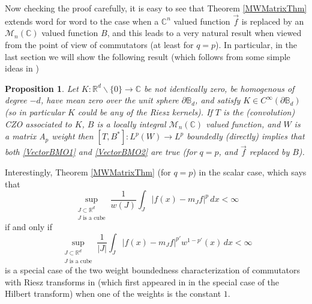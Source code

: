 \documentclass[12pt,reqno ]{amsart}
\numberwithin{equation}{section}
\newtheorem{proposition}[theorem]{Proposition}
\theoremstyle{definition}
\newcommand{\C}{\ensuremath{\mathbb{C}^n}}
\newcommand{\R}{\ensuremath{\mathbb{R}}}
\newcommand{\Mn}{\ensuremath{\mathcal{M}_{n }}(\mathbb{C})}
\begin{document}
 Now checking the proof carefully, it is easy to see that Theorem \ref{MWMatrixThm}  extends word for word to the case when a $\C$ valued function $\vec{f}$ is replaced by an $\Mn$ valued function $B$, and this leads to a very natural result when viewed from the point of view of commutators (at least for $q = p$).  In particular, in the last section we will show the following result (which follows from some simple ideas in \cite{IKP})  \begin{proposition}  \label{CommProp} Let $K : \mathbb{R}^d \backslash \{0\} \rightarrow \mathbb{C}$  be not identically zero, be homogenous of degree $-d$, have mean zero over the unit sphere $\partial \mathbb{B}_d$, and satisfy $K \in C^{\infty} (\partial \mathbb{B}_d)$ (so in particular $K$ could be any of the Riesz kernels).  If $T$ is the (convolution) CZO associated to $K$,  $B$ is a locally integral $\Mn$ valued function, and $W$ is a matrix A${}_p$ weight then $[T, B^*] : L^p(W) \rightarrow L^p$ boundedly (directly) implies that \textit{both}  \eqref{VectorBMO1} and \eqref{VectorBMO2} are true (for $q = p$, and $\vec{f}$ replaced by $B$).   \end{proposition}


 Interestingly, Theorem  \ref{MWMatrixThm} (for $q = p$) in the scalar case, which says that
\begin{equation*}  \sup_{\substack{J \subset \R^d \\  J \text{ is a cube}}}  \frac{1}{w(J)} \int_J |  f (x) - m_J {f}|^p \, dx < \infty \end{equation*} if and only if \begin{equation*}  \sup_{\substack{J \subset \R^d \\  J \text{ is a cube}}}  \frac{1}{|J|} \int_J |f (x) - m_J f|^{p'} w^{1 -p'} (x) \, dx < \infty \end{equation*} is a special case of the two weight boundedness characterization of commutators with Riesz transforms in \cite{HLW} (which first appeared in \cite{B} in the special case of the Hilbert transform) when one of the weights is the constant $1$.
\end{document}
